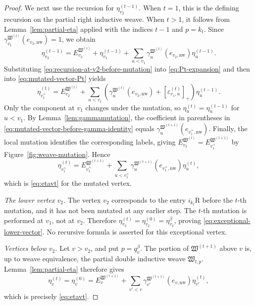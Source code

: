 \documentclass[12pt, reqno]{amsart}
\theoremstyle{plain}
\theoremstyle{definition}
\numberwithin{equation}{section}
\begin{document}
\begin{proof}
We next use the recursion for \(\eta_{v_2}^{(t-1)}\). When \(t=1\),
this is the defining recursion on the partial right inductive weave.
When \(t>1\), it follows from Lemma~\ref{lem:partial-eta} applied with
the indices \(t-1\) and \(p=k_t\). Since
\(\gamma_{v_1}^{\mathfrak W^{(t)}}
(e_{v_2,\mathrm{nw}})=1\), we obtain
\begin{equation}\label{eq:recursion-at-v2-before-mutation}
    \eta_{v_2}^{(t-1)}
    =E_{v_2}^{\mathfrak W^{(t)}}+
     \eta_{v_1}^{(t-1)}+
     \sum_{u<v_1}
     \gamma_u^{\mathfrak W^{(t)}}
        (e_{v_2,\mathrm{nw}})\eta_u^{(t-1)}.
\end{equation}
Substituting \eqref{eq:recursion-at-v2-before-mutation} into
\eqref{eq:Pt-expansion} and then into
\eqref{eq:mutated-vector-Pt} yields
\begin{equation}\label{eq:mutated-vector-before-gamma-identity}
    \eta_{v_1^+}^{(t)}
    =E_{v_2}^{\mathfrak W^{(t)}}+
     \sum_{u<v_1}
     \left(
       \gamma_u^{\mathfrak W^{(t)}}
          (e_{v_2,\mathrm{nw}})
       +[\varepsilon_{v_1,u}^{(t)}]_+
     \right)\eta_u^{(t-1)}.
\end{equation}
Only the component at \(v_1\) changes under the mutation, so
\(\eta_u^{(t)}=\eta_u^{(t-1)}\) for \(u<v_1\). By
Lemma~\ref{lem:gammamutation}, the coefficient in parentheses in
\eqref{eq:mutated-vector-before-gamma-identity} equals
\(\gamma_u^{\mathfrak W^{(t+1)}}
(e_{v_1^+,\mathrm{nw}})\). Finally, the local mutation identifies the
corresponding labels, giving
\(E_{v_2}^{\mathfrak W^{(t)}}
=E_{v_1^+}^{\mathfrak W^{(t+1)}}\) by Figure~\ref{fig:weave-mutation}. Hence
\begin{equation}\label{eq:eta-recursion-mutated-vertex}
    \eta_{v_1^+}^{(t)}
    =E_{v_1^+}^{\mathfrak W^{(t+1)}}+
     \sum_{u<v_1^+}
     \gamma_u^{\mathfrak W^{(t+1)}}
       (e_{v_1^+,\mathrm{nw}})\eta_u^{(t)},
\end{equation}
which is \eqref{eq:etavt} for the mutated vertex.

\smallskip
\noindent
\emph{The lower vertex \(v_2\).}
The vertex \(v_2\) corresponds to the entry
\(i_{k_t}\mathrm R\) before the \(t\)-th mutation, and it has not
been mutated at any earlier step. The \(t\)-th mutation is performed
at \(v_1\), not at \(v_2\). Therefore
\(\eta_{v_2}^{(t)}=\eta_{v_2}^{(0)}=\eta_{v_2}^\beta\), proving
\eqref{eq:exceptional-lower-vector}. No recursive formula is asserted
for this exceptional vertex.

\smallskip
\noindent
\emph{Vertices below \(v_2\).}
Let \(v>v_2\), and put
\(p=q_v^\beta\). The portion of \(\mathfrak W^{(t+1)}\) above \(v\)
is, up to weave equivalence, the partial double inductive weave
\(\mathfrak W_{t,p}\). Lemma~\ref{lem:partial-eta} therefore gives
\begin{equation}\label{eq:eta-recursion-below-local-mutation}
    \eta_v^{(t)}=\eta_v^{(0)}
    =E_v^{\mathfrak W^{(t+1)}}+
     \sum_{v'<v}
     \gamma_{v'}^{\mathfrak W^{(t+1)}}
       (e_{v,\mathrm{nw}})\eta_{v'}^{(t)},
\end{equation}
which is precisely \eqref{eq:etavt}.


\end{proof}
\end{document}

